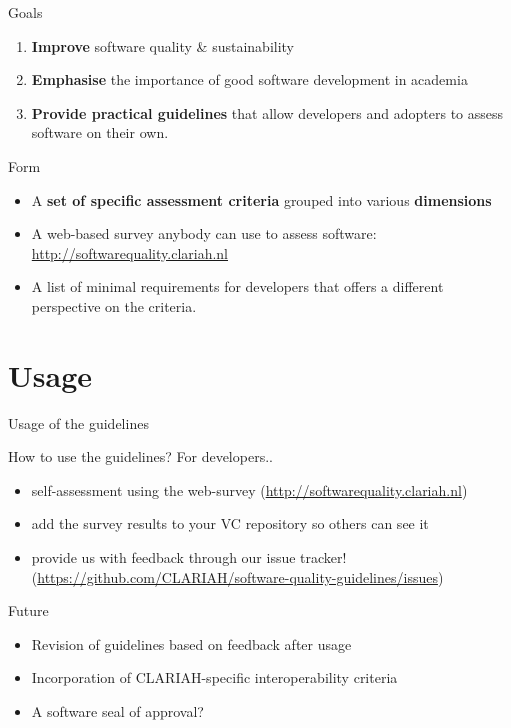 \documentclass[compress]{beamer}
\begin{document}
\begin{frame}
    \begin{block}{Goals}
        \begin{enumerate}
            \item \textbf{Improve} software quality \& sustainability
            \item \textbf{Emphasise} the importance of good software development in academia
            \item \textbf{Provide practical guidelines} that allow developers and adopters to assess software on their own.
        \end{enumerate}
    \end{block}
    \begin{block}{Form}
        \begin{itemize}
            \item A \textbf{set of specific assessment criteria} grouped into various \textbf{dimensions}
            \item A web-based survey anybody can use to assess software: \url{http://softwarequality.clariah.nl}
            \item A list of minimal requirements for developers that offers a different perspective on the criteria.
        \end{itemize}
    \end{block}
\end{frame}

\section{Usage}

\begin{frame}{Usage of the guidelines}
    \begin{block}{How to use the guidelines?}
        For developers..
        \begin{itemize}
            \item self-assessment using the web-survey (\url{http://softwarequality.clariah.nl})
            \item add the survey results to your VC repository so others can see it
            \item provide us with feedback through our issue tracker!
                (\url{https://github.com/CLARIAH/software-quality-guidelines/issues})
        \end{itemize}
    \end{block}

    \begin{block}{Future}
        \begin{itemize}
            \item Revision of guidelines based on feedback after usage
            \item Incorporation of CLARIAH-specific interoperability criteria
            \item A software seal of approval?
        \end{itemize}
    \end{block}
\end{frame}
\end{document}
